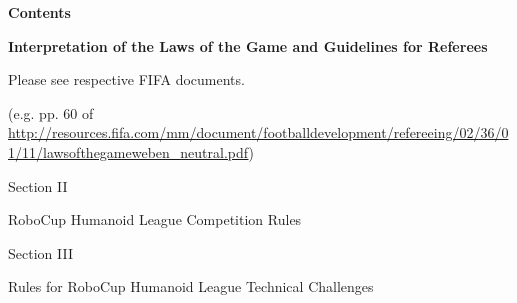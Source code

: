 \documentclass[a4paper]{article}
\begin{document}


\clearpage
{\bfseries\color[rgb]{0.4,0.4,0.4}
Contents}
\renewcommand\contentsname{}
\vspace*{-1cm}
\tableofcontents


\clearpage























\bigskip


\bigskip

\clearpage
{\Huge{\bfseries
Interpretation of the Laws of the Game and Guidelines for Referees}

\vspace*{1.5cm}

{\Large
Please see respective FIFA documents.}}

{\scriptsize 	
(e.g. pp. 60 of
\url{http://resources.fifa.com/mm/document/footballdevelopment/refereeing/02/36/01/11/lawsofthegameweben_neutral.pdf})}




\clearpage

\begin{center}
\Huge\bfseries{
\vspace*{3cm}
Section II

\vspace*{2cm}

RoboCup Humanoid League Competition Rules}
\end{center}







\clearpage

\begin{center}
\Huge\bfseries{
\vspace*{3cm}
Section III

\vspace*{2cm}

Rules for RoboCup Humanoid League Technical Challenges}
\end{center}






\end{document}
